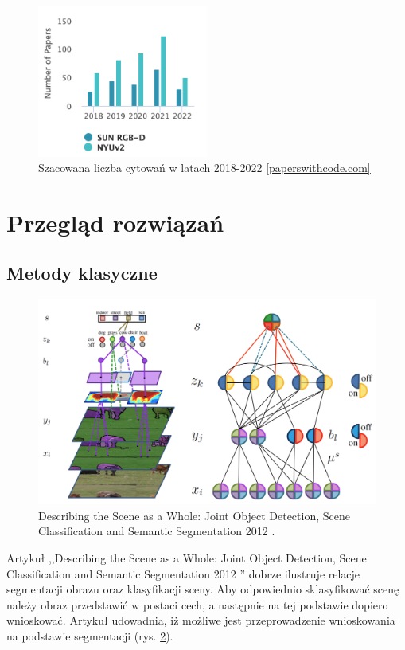 \begin{figure}
    \centering
    \includegraphics[width=0.5\textwidth]{images/stats-dataset.png}
    \caption[]{Szacowana liczba cytowań w latach 2018-2022 \href{https://paperswithcode.com/dataset/sun-rgb-d}{[paperswithcode.com]}}
    \label{fig:sun-vs-nyu}
\end{figure}

\section{Przegląd rozwiązań}
\subsection{Metody klasyczne}
\begin{figure}
    \includegraphics[width=\textwidth]{images/joint-segmentation-and-classification.png}
    \caption{Describing the Scene as a Whole: Joint Object Detection, Scene Classification and Semantic Segmentation 2012 \cite{yao2012describing}.}
    \label{fig:old-school-arch}
\end{figure}

Artykuł ,,Describing the Scene as a Whole: Joint Object Detection, Scene Classification and Semantic Segmentation 2012 \cite{yao2012describing}'' dobrze ilustruje relacje segmentacji obrazu oraz klasyfikacji sceny. Aby odpowiednio sklasyfikować scenę należy obraz przedstawić w postaci cech, a następnie na tej podstawie dopiero wnioskować. Artykuł \cite{yao2012describing} udowadnia, iż możliwe jest przeprowadzenie wnioskowania na podstawie segmentacji (rys. \ref{fig:old-school-arch}).

